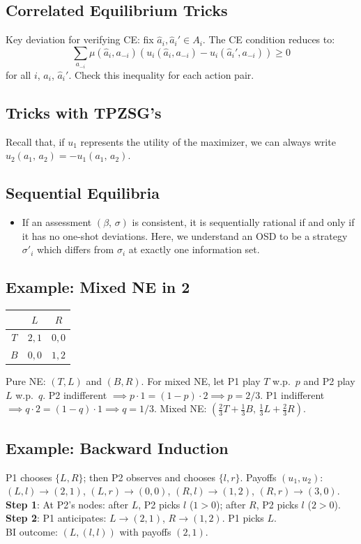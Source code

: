 \subsection{Correlated Equilibrium Tricks}
Key deviation for verifying CE: fix $\hat{a}_i, \hat{a}_i' \in A_i$. The CE condition reduces to:
$$\sum_{a_{-i}} \mu(\hat{a}_i, a_{-i}) (u_i(\hat{a}_i,a_{-i})-u_i(\hat{a}_i',a_{-i})) \geq 0$$
for all $i$, $\hat{a}_i$, $\hat{a}_i'$. Check this inequality for each action pair.

\subsection{Tricks with TPZSG's}
Recall that, if \(u_1\) represents the utility of the maximizer, we can always write \(u_2(a_1,\,a_2) = -u_1(a_1,\,a_2)\). 

\subsection{Sequential Equilibria}

\begin{itemize}
    \item If an assessment \((\beta,\, \sigma)\) is consistent, it is sequentially rational if and only if it has no one-shot deviations. Here, we understand an OSD to be a strategy \(\sigma'_i\) which differs from \(\sigma_i\) at exactly one information set.
\end{itemize}

\subsection{Example: Mixed NE in 2}
\begin{center}
\begin{tabular}{c|cc}
 & $L$ & $R$ \\ \hline
$T$ & $2,1$ & $0,0$ \\
$B$ & $0,0$ & $1,2$
\end{tabular}
\end{center}
Pure NE: $(T,L)$ and $(B,R)$. For mixed NE, let P1 play $T$ w.p.\ $p$ and P2 play $L$ w.p.\ $q$. P2 indifferent $\implies p \cdot 1 = (1-p)\cdot 2 \implies p = 2/3$. P1 indifferent $\implies q\cdot 2=(1-q)\cdot 1\implies q=1/3$. Mixed NE: $(\frac{2}{3}T + \frac{1}{3}B,\, \frac{1}{3}L + \frac{2}{3}R)$.

\subsection{Example: Backward Induction}
P1 chooses $\{L,R\}$; then P2 observes and chooses $\{l,r\}$. Payoffs $(u_1,u_2)$: $(L,l)\to(2,1)$, $(L,r)\to(0,0)$, $(R,l)\to(1,2)$, $(R,r)\to(3,0)$. \\
\textbf{Step 1}: At P2's nodes: after $L$, P2 picks $l$ ($1>0$); after $R$, P2 picks $l$ ($2>0$). \\
\textbf{Step 2}: P1 anticipates: $L\to(2,1)$, $R\to(1,2)$. P1 picks $L$. \\
BI outcome: $(L, (l,l))$ with payoffs $(2,1)$.


